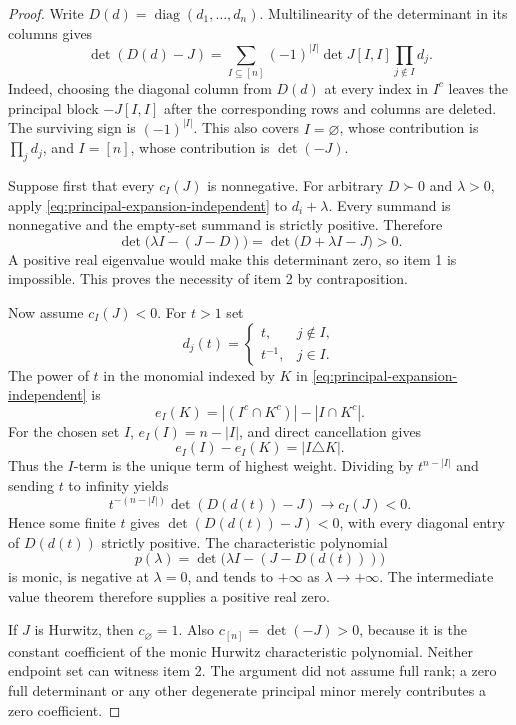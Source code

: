 \begin{proof}
Write $D(d)=\operatorname{diag}(d_1,\ldots,d_n)$.  Multilinearity of the
determinant in its columns gives
\begin{equation}
 \det(D(d)-J)
 =\sum_{I\subseteq[n]}(-1)^{|I|}\det J[I,I]
       \prod_{j\notin I}d_j.
 \label{eq:principal-expansion-independent}
\end{equation}
Indeed, choosing the diagonal column from $D(d)$ at every index in
$I^c$ leaves the principal block $-J[I,I]$ after the corresponding rows
and columns are deleted.  The surviving sign is $(-1)^{|I|}$.  This also
covers $I=\varnothing$, whose contribution is $\prod_jd_j$, and
$I=[n]$, whose contribution is $\det(-J)$.

Suppose first that every $c_I(J)$ is nonnegative.  For arbitrary $D\succ0$
and $\lambda>0$, apply \eqref{eq:principal-expansion-independent} to
$d_i+\lambda$.  Every summand is nonnegative and the empty-set summand is
strictly positive.  Therefore
\[
 \det\bigl(\lambda I-(J-D)\bigr)
 =\det\bigl(D+\lambda I-J\bigr)>0.
\]
A positive real eigenvalue would make this determinant zero, so item 1 is
impossible.  This proves the necessity of item 2 by contraposition.

Now assume $c_I(J)<0$.  For $t>1$ set
\[
 d_j(t)=\begin{cases}
 t,&j\notin I,\\
 t^{-1},&j\in I.
 \end{cases}
\]
The power of $t$ in the monomial indexed by $K$ in
\eqref{eq:principal-expansion-independent} is
\[
 e_I(K)=|(I^c\cap K^c)|-|I\cap K^c|.
\]
For the chosen set $I$, $e_I(I)=n-|I|$, and direct cancellation gives
\[
 e_I(I)-e_I(K)=|I\triangle K|.
\]
Thus the $I$-term is the unique term of highest weight.  Dividing by
$t^{n-|I|}$ and sending $t$ to infinity yields
\[
 t^{-(n-|I|)}\det(D(d(t))-J)\longrightarrow c_I(J)<0.
\]
Hence some finite $t$ gives $\det(D(d(t))-J)<0$, with every diagonal
entry of $D(d(t))$ strictly positive.  The characteristic polynomial
\[
 p(\lambda)=\det\bigl(\lambda I-(J-D(d(t)))\bigr)
\]
is monic, is negative at $\lambda=0$, and tends to $+\infty$ as
$\lambda\to+\infty$.  The intermediate value theorem therefore supplies
a positive real zero.

If $J$ is Hurwitz, then $c_\varnothing=1$.  Also
$c_{[n]}=\det(-J)>0$, because it is the constant coefficient of the monic
Hurwitz characteristic polynomial.  Neither endpoint set can witness item 2.
The argument did not assume full rank; a zero full determinant or any other
degenerate principal minor merely contributes a zero coefficient.
\end{proof}

